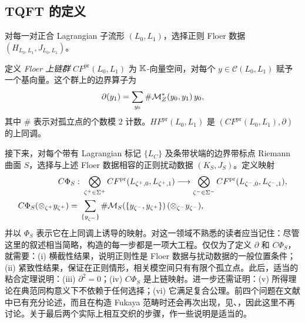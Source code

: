 \subsection{TQFT 的定义}\label{sec:8j}
对每一对正合 Lagrangian 子流形 $(L_0,L_1)$，选择正则 Floer 数据 $(H_{L_0,L_1},J_{L_0,L_1})$。
\begin{definition*}
定义 \emph{Floer 上链群} $CF^{\mathrm{pr}}(L_0,L_1)$ 为 $\mathbb K$-向量空间，对每个 $y\in\mathcal C(L_0,L_1)$ 赋予一个基向量。这个群上的边界算子为
\begin{equation}\label{eq:8.19}
\partial(y_1)=\sum_{y_0}\#\mathcal M_Z^*(y_0,y_1)\,y_0,
\end{equation}
其中 $\#$ 表示对孤立点的个数模 $2$ 计数。$HF^{\mathrm{pr}}(L_0,L_1)$ 是 $(CF^{\mathrm{pr}}(L_0,L_1),\partial)$ 的上同调。
\end{definition*}
接下来，对每个带有 Lagrangian 标记 $\{L_C\}$ 及条带状端的边界带标点 Riemann 曲面 $S$，选择与上述 Floer 数据相容的正则扰动数据 $(K_S,J_S)$。定义映射
\begin{equation}\label{eq:8.20}
\begin{aligned}
C\Phi_S:&\ \bigotimes_{\zeta^+\in\Sigma^+}CF^{\mathrm{pr}}(L_{\zeta^+,0},L_{\zeta^+,1})
\longrightarrow\bigotimes_{\zeta^-\in\Sigma^-}CF^{\mathrm{pr}}(L_{\zeta^-,0},L_{\zeta^-,1}),\\
C\Phi_S(\otimes_{\zeta^+}y_{\zeta^+})
={}&\sum_{\{y_{\zeta^-}\}}\#\M_S(\{y_{\zeta^-},y_{\zeta^+}\})\,(\otimes_{\zeta^-}y_{\zeta^-}),
\end{aligned}
\end{equation}
并以 $\Phi_S$ 表示它在上同调上诱导的映射。对这一领域不熟悉的读者应当记住：尽管这里的叙述相当简略，构造的每一步都是一项大工程。仅仅为了定义 $\partial$ 和 $C\Phi_S$，就需要：(i) 横截性结果，说明正则性是 Floer 数据与扰动数据的一般位置条件；(ii) 紧致性结果，保证在正则情形，相关模空间只有有限个孤立点。此后，适当的粘合定理说明：(iii) $\partial^2=0$；(iv) $C\Phi_S$ 是上链映射。进一步还需证明：(v) 所得理论在典范同构意义下不依赖于任何选择；(vi) 它满足复合公理。前四个问题在文献中已有充分论述，而且在构造 Fukaya 范畴时还会再次出现，见、，因此这里不再讨论。关于最后两个实际上相互交织的步骤，作一些说明是适当的。

